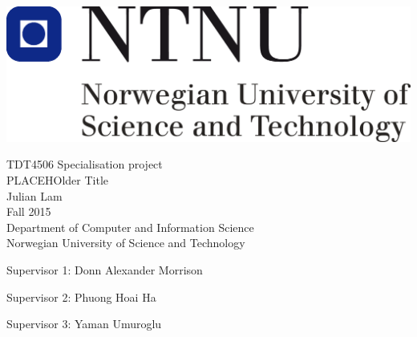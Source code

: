 \thispagestyle{empty}
\includegraphics[scale=0.3]{Figures/ntnu}
\mbox{}\\[6pc]
\begin{center}
\Large{TDT4506 Specialisation project}\\[1pc]
\Huge{PLACEHOlder Title}\\[2pc]

\Large{Julian Lam}\\[1pc]
\large{Fall 2015}\\[2pc]


Department of Computer and Information Science\\
Norwegian University of Science and Technology
\end{center}
\vfill

\noindent Supervisor 1: Donn Alexander Morrison

\noindent Supervisor 2: Phuong Hoai Ha 

\noindent Supervisor 3: Yaman Umuroglu